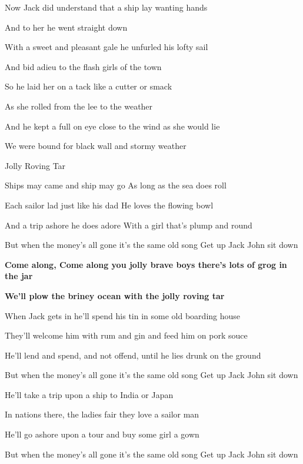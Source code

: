 \documentclass[letterpaper,9pt]{article}
\begin{document}
\hfill

Now Jack did understand that a ship lay wanting hands

And to her he went straight down

With a sweet and pleasant gale he unfurled his lofty sail

And bid adieu to the flash girls of the town

\hfill

So he laid her on a tack like a cutter or smack

As she rolled from the lee to the weather

And he kept a full on eye close to the wind as she would lie

We were bound for black wall and stormy weather

\newpage
{}
\Huge
Jolly Roving Tar

\hfill

\Large
Ships may came and ship may go As long as the sea does roll

Each sailor lad just like his dad He loves the flowing bowl

And a trip ashore he does adore With a girl that's plump and round 

But when the money's all gone it's the same old song Get up Jack John sit down

\hfill

\large
\textbf{Come along, Come along you jolly brave boys there’s lots of grog in the jar
}

\textbf{We'll plow the briney ocean with the jolly roving tar}

\hfill

\Large
When Jack gets in he'll spend his tin in some old boarding house

They'll welcome him with rum and gin and feed him on pork souce

He'll lend and spend, and not offend, until he lies drunk on the ground

But when the money's all gone it's the same old song Get up Jack John sit down

\hfill

He'll take a trip upon a ship to India or Japan

In nations there, the ladies fair they love a sailor man

He'll go ashore upon a tour and buy some girl a gown

But when the money's all gone it's the same old song Get up Jack John sit down
\end{document}
